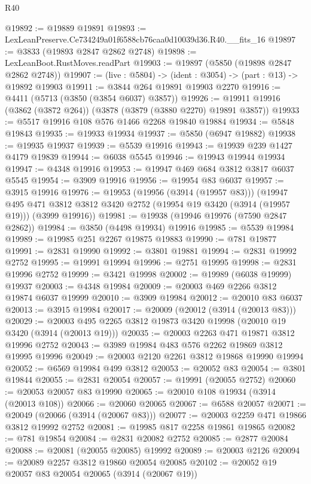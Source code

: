\begin{lexlean}{R40}
\begin{coremodule}
@19892 := @19889 @19891
@19893 := LexLeanPreserve.Ce734249a01f6588cb76caa0d10039d36.R40.__fits_16
@19897 := @3833 (@19893 @2847 @2862 @2748)
@19898 := LexLeanBoot.RustMoves.readPart
@19903 := @19897 (@5850 (@19898 @2847 @2862 @2748))
@19907 := (live : @5804) -> (ident : @3054) -> (part : @13) -> @19892 @19903
@19911 := @3844 @264 @19891 @19903 @2270
@19916 := @4411 (@5713 (@3850 (@3854 @6037) @3857))
@19926 := @19911 @19916 (@3862 (@3872 @264)) (@3878 (@3879 (@3880 @2270) @19891 @3857))
@19933 := @5517 @19916 @108 @576 @1466 @2268 @19840 @19884
@19934 := @5848 @19843
@19935 := @19933 @19934
@19937 := @5850 (@6947 @19882)
@19938 := @19935 @19937
@19939 := @5539 @19916
@19943 := @19939 @239 @1427 @4179 @19839
@19944 := @6038 @5545
@19946 := @19943 @19944 @19934
@19947 := @4348 @19916
@19953 := @19947 @469 @684 @3812 @3817 @6037 @5545
@19954 := @3909 @19916
@19956 := @19954 @83 @6037
@19957 := @3915 @19916
@19976 := @19953
    (@19956 (@3914 (@19957 @83)))
    (@19947
      @495
      @471
      @3812
      @3812
      @3420
      @2752
      (@19954 @19 @3420 (@3914 (@19957 @19)))
      (@3999 @19916))
@19981 := @19938 (@19946 @19976 (@7590 @2847 @2862))
@19984 := @3850 (@4498 @19934) @19916
@19985 := @5539 @19984
@19989 := @19985 @251 @2267 @19875 @19883
@19990 := @781 @19877
@19991 := @2831 @19990
@19992 := @3801 @19881
@19994 := @2831 @19992 @2752
@19995 := @19991 @19994
@19996 := @2751 @19995
@19998 := @2831 @19996 @2752
@19999 := @3421 @19998
@20002 := @19989 (@6038 @19999) @19937
@20003 := @4348 @19984
@20009 := @20003 @469 @2266 @3812 @19874 @6037 @19999
@20010 := @3909 @19984
@20012 := @20010 @83 @6037
@20013 := @3915 @19984
@20017 := @20009 (@20012 (@3914 (@20013 @83)))
@20029 := @20003 @495 @2265 @3812 @19873 @3420 @19998 (@20010 @19 @3420 (@3914 (@20013 @19)))
@20035 := @20003 @2263 @471 @19871 @3812 @19996 @2752
@20043 := @3989 @19984 @483 @576 @2262 @19869 @3812 @19995 @19996
@20049 := @20003 @2120 @2261 @3812 @19868 @19990 @19994
@20052 := @6569 @19984 @499 @3812
@20053 := @20052 @83
@20054 := @3801 @19844
@20055 := @2831 @20054
@20057 := @19991 (@20055 @2752)
@20060 := @20053 @20057 @83 @19990
@20065 := @20010 @108 @19934 (@3914 (@20013 @108))
@20066 := @20060 @20065
@20067 := @6588 @20057
@20071 := @20049 (@20066 (@3914 (@20067 @83)))
@20077 := @20003 @2259 @471 @19866 @3812 @19992 @2752
@20081 := @19985 @817 @2258 @19861 @19865
@20082 := @781 @19854
@20084 := @2831 @20082 @2752
@20085 := @2877 @20084
@20088 := @20081 (@20055 @20085) @19992
@20089 := @20003 @2126
@20094 := @20089 @2257 @3812 @19860 @20054 @20085
@20102 := @20052 @19 @20057 @83 @20054 @20065 (@3914 (@20067 @19))

\end{coremodule}
\end{lexlean}
